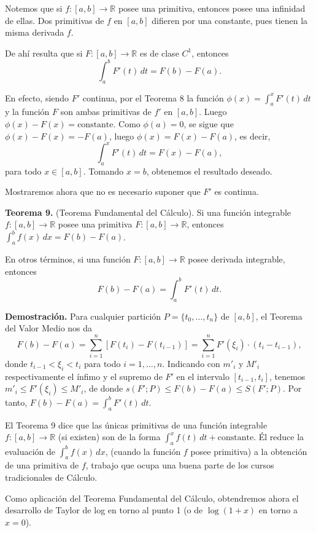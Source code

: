 \documentclass[12pt,oneside]{book}
\begin{document}
Notemos que si \(f: [a, b] \to \mathbb{R}\) posee una primitiva, entonces posee una infinidad de ellas. Dos primitivas de \(f\) en \([a, b]\) difieren por una constante, pues tienen la misma derivada \(f\).

De ahí resulta que si \(F: [a, b] \to \mathbb{R}\) es de clase \(C^1\), entonces
\[
\int_a^b F'(t) \, dt = F(b) - F(a).
\]

En efecto, siendo \(F'\) continua, por el Teorema 8 la función \(\phi(x) = \int_a^x F'(t) \, dt\) y la función \(F\) son ambas primitivas de \(f'\) en \([a, b]\). Luego \(\phi(x) - F(x) = \text{constante}\). Como \(\phi(a) = 0\), se sigue que \(\phi(x) - F(x) = -F(a)\), luego \(\phi(x) = F(x) - F(a)\), es decir,
\[
\int_a^x F'(t) \, dt = F(x) - F(a),
\]
para todo \(x \in [a, b]\). Tomando \(x = b\), obtenemos el resultado deseado.

Mostraremos ahora que no es necesario suponer que \(F'\) es continua.

\textbf{Teorema 9.} (Teorema Fundamental del Cálculo). Si una función integrable \(f: [a, b] \to \mathbb{R}\) posee una primitiva \(F: [a, b] \to \mathbb{R}\), entonces \(\int_a^b f(x) \, dx = F(b) - F(a)\).

En otros términos, si una función \(F: [a, b] \to \mathbb{R}\) posee derivada integrable, entonces
\[F(b) - F(a) = \int_a^b F'(t) \, dt.\]

\textbf{Demostración.} Para cualquier partición \(P = \{t_0, \dots, t_n\}\) de \([a, b]\), el Teorema del Valor Medio nos da
\[F(b) - F(a) = \sum_{i=1}^n [F(t_i) - F(t_{i-1})] = \sum_{i=1}^n F'(\xi_i) \cdot (t_i - t_{i-1}),\]
donde \(t_{i-1} < \xi_i < t_i\) para todo \(i = 1, \dots, n\). Indicando con \(m'_i\) y \(M'_i\) respectivamente el ínfimo y el supremo de \(F'\) en el intervalo \([t_{i-1}, t_i]\), tenemos \(m'_i \leq F'(\xi_i) \leq M'_i\), de donde \(s(F'; P) \leq F(b) - F(a) \leq S(F'; P)\). Por tanto, \(F(b) - F(a) = \int_a^b F'(t) \, dt\).

El Teorema 9 dice que las únicas primitivas de una función integrable \(f: [a, b] \to \mathbb{R}\) (si existen) son de la forma \(\int_a^x f(t) \, dt + \text{constante}\). Él reduce la evaluación de \(\int_a^b f(x) \, dx\), (cuando la función \(f\) posee primitiva) a la obtención de una primitiva de \(f\), trabajo que ocupa una buena parte de los cursos tradicionales de Cálculo.

Como aplicación del Teorema Fundamental del Cálculo, obtendremos ahora el desarrollo de Taylor de log en torno al punto 1 (o de \(\log(1+x)\) en torno a \(x=0\)).
\end{document}
